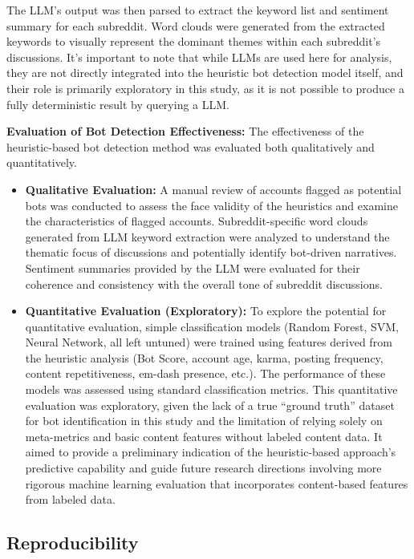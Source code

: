 \documentclass[
  12pt,
  letterpaper,
  DIV=11,
  numbers=noendperiod]{scrartcl}
\begin{document}
The LLM's output was then parsed to extract the keyword list and
sentiment summary for each subreddit. Word clouds were generated from
the extracted keywords to visually represent the dominant themes within
each subreddit's discussions. It's important to note that while LLMs are
used here for analysis, they are not directly integrated into the
heuristic bot detection model itself, and their role is primarily
exploratory in this study, as it is not possible to produce a fully
deterministic result by querying a LLM.

\textbf{Evaluation of Bot Detection Effectiveness:} The effectiveness of
the heuristic-based bot detection method was evaluated both
qualitatively and quantitatively.

\begin{itemize}
\item
  \textbf{Qualitative Evaluation:} A manual review of accounts flagged
  as potential bots was conducted to assess the face validity of the
  heuristics and examine the characteristics of flagged accounts.
  Subreddit-specific word clouds generated from LLM keyword extraction
  were analyzed to understand the thematic focus of discussions and
  potentially identify bot-driven narratives. Sentiment summaries
  provided by the LLM were evaluated for their coherence and consistency
  with the overall tone of subreddit discussions.
\item
  \textbf{Quantitative Evaluation (Exploratory):} To explore the
  potential for quantitative evaluation, simple classification models
  (Random Forest, SVM, Neural Network, all left untuned) were trained
  using features derived from the heuristic analysis (Bot Score, account
  age, karma, posting frequency, content repetitiveness, em-dash
  presence, etc.). The performance of these models was assessed using
  standard classification metrics. This quantitative evaluation was
  exploratory, given the lack of a true ``ground truth'' dataset for bot
  identification in this study and the limitation of relying solely on
  meta-metrics and basic content features without labeled content data.
  It aimed to provide a preliminary indication of the heuristic-based
  approach's predictive capability and guide future research directions
  involving more rigorous machine learning evaluation that incorporates
  content-based features from labeled data.
\end{itemize}

\subsection{Reproducibility}\label{reproducibility}
\end{document}

